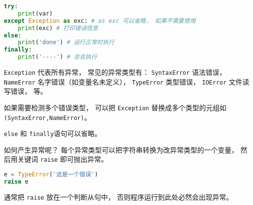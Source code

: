 
\begin{issues}
\issueDraft
\end{issues}

\begin{lstlisting}[language=python]
try:
    print(var)
except Exception as exc: # as exc 可以省略， 如果不需要使用
    print(exc) # 打印错误信息
else:
    print('done') # 运行正常时执行
finally:
    print('----') # 总会执行
\end{lstlisting}

\verb|Exception| 代表所有异常， 常见的异常类型有： \verb|SyntaxError| 语法错误， \verb|NameError| 名字错误（如变量名未定义）， \verb|TypeError| 类型错误， \verb|IOError| 文件读写错误， 等。

如果需要检测多个错误类型， 可以把 \verb|Exception| 替换成多个类型的元组如 \verb|(SyntaxError,NameError)|。

\verb|else| 和 \verb|finally|语句可以省略。

如何产生异常呢？ 每个异常类型可以把字符串转换为改异常类型的一个变量， 然后用关键词 \verb|raise| 即可抛出异常。
\begin{lstlisting}[language=python]
e = TypeError('这是一个错误')
raise e
\end{lstlisting}
通常把 \verb|raise| 放在一个判断从句中， 否则程序运行到此处必然会出现异常。
